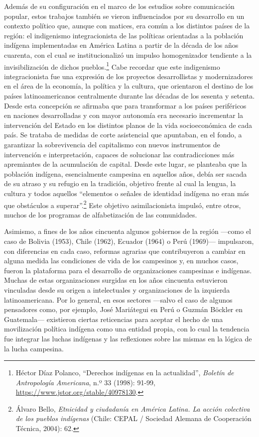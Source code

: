 \documentclass{tufte-handout}
\begin{document}
Además de su configuración en el marco de los estudios sobre
comunicación popular, estos trabajos también se vieron influenciados por
su desarrollo en un contexto político que, aunque con matices, era común
a los distintos países de la región: el indigenismo integracionista de
las políticas orientadas a la población indígena implementadas en
América Latina a partir de la década de los años cuarenta, con el cual
se institucionalizó un impulso homogenizador tendiente a la
invisibilización de dichos pueblos.\footnote{Héctor Díaz Polanco,
  ``Derechos indígenas en la actualidad'', \emph{Boletín de Antropología
  Americana}, n.º 33 (1998): 91-99,
  \url{https://www.jstor.org/stable/40978130}.} Cabe recordar que este
indigenismo integracionista fue una expresión de los proyectos
desarrollistas y modernizadores en el área de la economía, la política y
la cultura, que orientaron el destino de los países latinoamericanos
centralmente durante las décadas de los sesenta y setenta. Desde esta
concepción se afirmaba que para transformar a los países periféricos en
naciones desarrolladas y con mayor autonomía era necesario incrementar
la intervención del Estado en los distintos planos de la vida
socioeconómica de cada país. Se trataba de medidas de corte asistencial
que apuntaban, en el fondo, a garantizar la sobrevivencia del
capitalismo con nuevos instrumentos de intervención e interpretación,
capaces de solucionar las contradicciones más apremiantes de la
acumulación de capital. Desde este lugar, se planteaba que la población
indígena, esencialmente campesina en aquellos años, debía ser sacada de
su atraso y su refugio en la tradición, objetivo frente al cual la
lengua, la cultura y todos aquellos ``elementos o señales de identidad
indígena no eran más que obstáculos a superar''.\footnote{Álvaro Bello,
  \emph{Etnicidad y ciudadanía en América Latina. La acción colectiva de
  los pueblos indígenas} (Chile: CEPAL / Sociedad Alemana de Cooperación
  Técnica, 2004): 62.} Este objetivo asimilacionista impulsó, entre
otros, muchos de los programas de alfabetización de las comunidades.

Asimismo, a fines de los años cincuenta algunos gobiernos de la región
---como el caso de Bolivia (1953), Chile (1962), Ecuador (1964) o Perú
(1969)--- impulsaron, con diferencias en cada caso, reformas agrarias
que contribuyeron a cambiar en alguna medida las condiciones de vida de
los campesinos y, en muchos casos, fueron la plataforma para el
desarrollo de organizaciones campesinas e indígenas. Muchas de estas
organizaciones surgidas en los años cincuenta estuvieron vinculadas
desde su origen a intelectuales y organizaciones de la izquierda
latinoamericana. Por lo general, en esos sectores ---salvo el caso de
algunos pensadores como, por ejemplo, José Mariátegui en Perú o Guzmán
Böckler en Guatemala--- existieron ciertas reticencias para aceptar el
hecho de una movilización política indígena como una entidad propia, con
lo cual la tendencia fue integrar las luchas indígenas y las reflexiones
sobre las mismas en la lógica de la lucha campesina.
\end{document}
